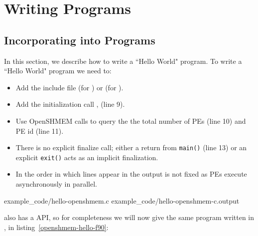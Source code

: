 \clearpage

\appendix

\pagestyle{fancy} \withlinenumbers
\fancyhf{}
\fancyhead[RE, LO]{\leftmark}
\fancyhead[RO, LE]{\thepage}
\fancyfoot[CE,CO]{\thepage}
\renewcommand{\headrulewidth}{0pt}




\chapter{Writing \openshmem Programs}
\section*{Incorporating \openshmem{} into Programs}\label{sec:writing_programs}

In this section, we describe how to write a ``Hello World" \openshmem program.
To write a ``Hello World" \openshmem program we need to: 

\begin{itemize}
\item Add the include file  (for \Cstd) or  (for \Fortran).
\item Add the initialization call , (line 9).
\item Use OpenSHMEM calls to query the the total number of PEs (line 10) and PE
    id (line 11).
\item There is no explicit finalize call; either a return from \texttt{main()}
    (line 13) or an explicit \texttt{exit()} acts as an implicit \openshmem
    finalization.
\item In \openshmem the order in which lines appear in the output is not fixed
    as \ac{PE}s execute asynchronously in parallel.
\end{itemize}

\begin{minipage}{\linewidth}
\vspace{0.1in}
                {example_code/hello-openshmem.c}
                {example_code/hello-openshmem-c.output}
\vspace{0.1in}
\end{minipage}

\openshmem also has a \Fortran{} API, so for completeness we will now give the
same program written in \Fortran, in listing~\ref{openshmem-hello-f90}:

